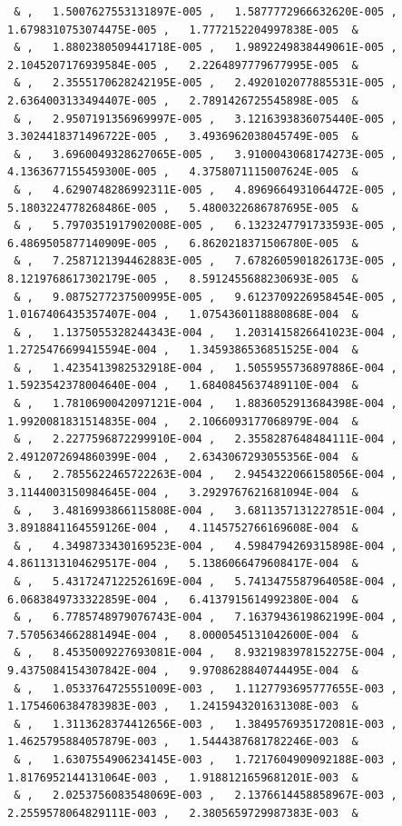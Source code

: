 \documentclass[a4paper,10pt]{report}
\begin{document}
{\begin{verbatim}
 & ,   1.5007627553131897E-005 ,   1.5877772966632620E-005 ,   1.6798310753074475E-005 ,   1.7772152204997838E-005  &
 & ,   1.8802380509441718E-005 ,   1.9892249838449061E-005 ,   2.1045207176939584E-005 ,   2.2264897779677995E-005  &
 & ,   2.3555170628242195E-005 ,   2.4920102077885531E-005 ,   2.6364003133494407E-005 ,   2.7891426725545898E-005  &
 & ,   2.9507191356969997E-005 ,   3.1216393836075440E-005 ,   3.3024418371496722E-005 ,   3.4936962038045749E-005  &
 & ,   3.6960049328627065E-005 ,   3.9100043068174273E-005 ,   4.1363677155459300E-005 ,   4.3758071115007624E-005  &
 & ,   4.6290748286992311E-005 ,   4.8969664931064472E-005 ,   5.1803224778268486E-005 ,   5.4800322686787695E-005  &
 & ,   5.7970351917902008E-005 ,   6.1323247791733593E-005 ,   6.4869505877140909E-005 ,   6.8620218371506780E-005  &
 & ,   7.2587121394462883E-005 ,   7.6782605901826173E-005 ,   8.1219768617302179E-005 ,   8.5912455688230693E-005  &
 & ,   9.0875277237500995E-005 ,   9.6123709226958454E-005 ,   1.0167406435357407E-004 ,   1.0754360118880868E-004  &
 & ,   1.1375055328244343E-004 ,   1.2031415826641023E-004 ,   1.2725476699415594E-004 ,   1.3459386536851525E-004  &
 & ,   1.4235413982532918E-004 ,   1.5055955736897886E-004 ,   1.5923542378004640E-004 ,   1.6840845637489110E-004  &
 & ,   1.7810690042097121E-004 ,   1.8836052913684398E-004 ,   1.9920081831514835E-004 ,   2.1066093177068979E-004  &
 & ,   2.2277596872299910E-004 ,   2.3558287648484111E-004 ,   2.4912072694860399E-004 ,   2.6343067293055356E-004  &
 & ,   2.7855622465722263E-004 ,   2.9454322066158056E-004 ,   3.1144003150984645E-004 ,   3.2929767621681094E-004  &
 & ,   3.4816993866115808E-004 ,   3.6811357131227851E-004 ,   3.8918841164559126E-004 ,   4.1145752766169608E-004  &
 & ,   4.3498733430169523E-004 ,   4.5984794269315898E-004 ,   4.8611313104629517E-004 ,   5.1386066479608417E-004  &
 & ,   5.4317247122526169E-004 ,   5.7413475587964058E-004 ,   6.0683849733322859E-004 ,   6.4137915614992380E-004  &
 & ,   6.7785748979076743E-004 ,   7.1637943619862199E-004 ,   7.5705634662881494E-004 ,   8.0000545131042600E-004  &
 & ,   8.4535009227693081E-004 ,   8.9321983978152275E-004 ,   9.4375084154307842E-004 ,   9.9708628840744495E-004  &
 & ,   1.0533764725551009E-003 ,   1.1127793695777655E-003 ,   1.1754606384783983E-003 ,   1.2415943201631308E-003  &
 & ,   1.3113628374412656E-003 ,   1.3849576935172081E-003 ,   1.4625795884057879E-003 ,   1.5444387681782246E-003  &
 & ,   1.6307554906234145E-003 ,   1.7217604909092188E-003 ,   1.8176952144131064E-003 ,   1.9188121659681201E-003  &
 & ,   2.0253756083548069E-003 ,   2.1376614458858967E-003 ,   2.2559578064829111E-003 ,   2.3805659729987383E-003  &

\end{verbatim}}
\end{document}
